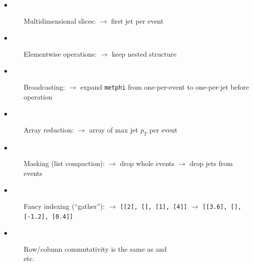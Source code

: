 \documentclass{webofc}
\begin{document}
\begin{description}
\item[\hspace{1 cm}$\bullet$] Multidimensional slices:  $\to$ first jet per event
\item[\hspace{1 cm}$\bullet$] Elementwise operations:  $\to$ keep nested structure
\item[\hspace{1 cm}$\bullet$] Broadcasting:  $\to$ expand {\small \texttt{metphi}} from
\tabto{5.8 cm}one-per-event to one-per-jet before operation
\item[\hspace{1 cm}$\bullet$] Array reduction:  $\to$ array of max jet $p_T$ per event
\item[\hspace{1 cm}$\bullet$] Masking (list compaction):  $\to$ drop whole events
 $\to$ drop jets from events  
\item[\hspace{1 cm}$\bullet$] Fancy indexing (``gather''):  $\to$ {\small \texttt{[[2], [], [1], [4]]}}
 $\to$ \mbox{\small \texttt{[[3.6], [], [-1.2], [0.4]]}\hspace{-0.5 cm}}
\item[\hspace{1 cm}$\bullet$] Row/column commutativity  is the same as
 and \\
 etc.
\end{description}


\end{document}
